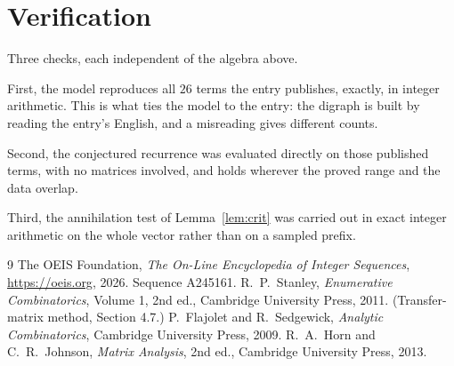 \documentclass[11pt,a4paper]{article}
\theoremstyle{plain}
\theoremstyle{definition}
\begin{document}
\section{Verification}

Three checks, each independent of the algebra above.

First, the model reproduces all $26$ terms the entry publishes, exactly, in integer
arithmetic. This is what ties the model to the entry: the digraph is built by reading the
entry's English, and a misreading gives different counts.

Second, the conjectured recurrence was evaluated directly on those published terms, with no
matrices involved, and holds wherever the proved range and the data overlap.

Third, the annihilation test of Lemma~\ref{lem:crit} was carried out in exact integer
arithmetic on the whole vector rather than on a sampled prefix.

\begin{thebibliography}{9}
 The OEIS Foundation, \emph{The On-Line Encyclopedia of Integer
Sequences}, \url{https://oeis.org}, 2026. Sequence A245161.
 R.~P.~Stanley, \emph{Enumerative Combinatorics}, Volume 1, 2nd ed.,
Cambridge University Press, 2011. (Transfer-matrix method, Section 4.7.)
 P.~Flajolet and R.~Sedgewick, \emph{Analytic Combinatorics}, Cambridge
University Press, 2009.
 R.~A.~Horn and C.~R.~Johnson, \emph{Matrix Analysis}, 2nd ed., Cambridge
University Press, 2013.
\end{thebibliography}
\end{document}
